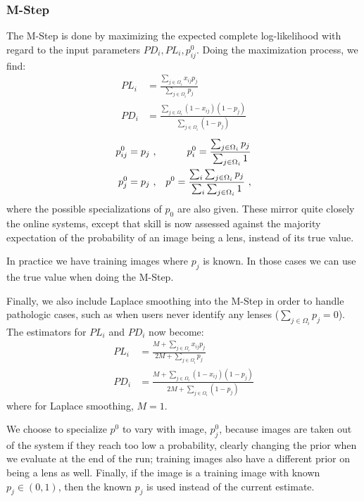 \documentclass[useAMS,usenatbib,a4paper]{mn2e}
\begin{document}

\subsubsection{M-Step}
\label{sec:formalism:em:mstep}
The M-Step is done by maximizing the expected complete log-likelihood with
regard to the input parameters $PD_{i}, PL_{i}, p_{ij}^{0}$. Doing the
maximization process, we find:
\begin{align}
  PL_{i} &= \frac{\sum_{j \in \Omega_i} x_{ij} p_{j}}{\sum_{j \in
\Omega_i} p_{j}} \\
  PD_{i} &= \frac{\sum_{j \in \Omega_i} (1 - x_{ij}) (1 - p_{j})}{\sum_{j \in
\Omega_i} (1 - p_{j})}
\end{align}
\begin{align}
  p_{ij}^{0} &= p_{j} \ , &p_{i}^{0} = \frac{\sum_{j \in \Omega_i}
p_{j}}{\sum_{j \in \Omega_i} 1} \notag\\
   p_{j}^{0} &= p_{j} \ , &p^{0} = \frac{\sum_i \sum_{j \in \Omega_i}
p_{j}}{\sum_i \sum_{j \in
  \Omega_i} 1} \ ,
\end{align}
where the possible specializations of $p_0$ are also given. These mirror quite
closely the online systems, except that skill is now assessed against
the majority expectation of the probability of an image being a lens, instead
of its true value.

In practice we have training images where $p_{j}$ is known. In those
cases we can use the true value when doing the M-Step.

Finally, we also include Laplace smoothing into the M-Step in order to handle
pathologic cases, such as when users never identify any lenses ($\sum_{j \in
\Omega_{i}} p_j = 0$). The estimators for $PL_{i}$ and $PD_{i}$ now become:
\begin{align}
  PL_{i} &= \frac{M + \sum_{j \in \Omega_i} x_{ij} p_{j}}{2M + \sum_{j \in
\Omega_i} p_{j}} \\
  PD_{i} &= \frac{M + \sum_{j \in \Omega_i} (1 - x_{ij}) (1 - p_{j})}{2M + \sum_{j \in
\Omega_i} (1 - p_{j})}
\end{align}
where for Laplace smoothing, $M = 1$.

We choose to specialize $p^{0}$ to vary with
image, $p_{j}^{0}$, because images are taken out of the \sw system if they reach
too low a probability, clearly changing the prior when we evaluate at the end
of the run; training images also have a
different prior on being a lens as well. Finally, if the image is a training
image with known $p_j \in (0,1)$, then the known $p_j$ is used instead of
the current estimate.
\end{document}
